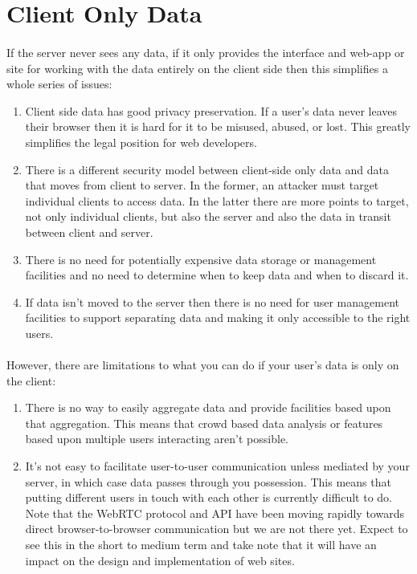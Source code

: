 \section{Client Only Data}
\paragraph{} If the server never sees any data, if it only provides the interface and web-app or site for working with the data entirely on the client side then this simplifies a whole series of issues:

\begin{enumerate}
\item Client side data has good privacy preservation. If a user's data never leaves their browser then it is hard for it to be misused, abused, or lost. This greatly simplifies the legal position for web developers.
\item There is a different security model between client-side only data and data that moves from client to server. In the former, an attacker must target individual clients to access data. In the latter there are more points to target, not only individual clients, but also the server and also the data in transit between client and server.
\item There is no need for potentially expensive data storage or management facilities and no need to determine when to keep data and when to discard it.
\item If data isn't moved to the server then there is no need for user management facilities to support separating data and making it only accessible to the right users.
\end{enumerate}

\paragraph{} However, there are limitations to what you can do if your user's data is only on the client:

\begin{enumerate}
\item There is no way to easily aggregate data and provide facilities based upon that aggregation. This means that crowd based data analysis or features based upon multiple users interacting aren't possible.
\item It's not easy to facilitate user-to-user communication unless mediated by your server, in which case data passes through you possession. This means that putting different users in touch with each other is currently difficult to do. Note that the WebRTC protocol and API have been moving rapidly towards direct browser-to-browser communication but we are not there yet. Expect to see this in the short to medium term and take note that it will have an impact on the design and implementation of web sites.
\end{enumerate}


